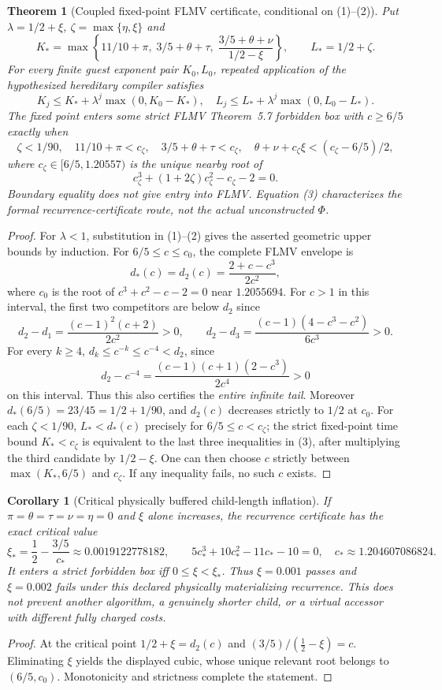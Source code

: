 \documentclass[11pt]{article}
\newtheorem{theorem}{Theorem}
\newtheorem{corollary}{Corollary}
\begin{document}
\begin{theorem}[Coupled fixed-point FLMV certificate, conditional on (1)--(2)]
Put $\lambda=1/2+\xi$, $\zeta=\max\{\eta,\xi\}$ and
\[
K_*=\max\left\{11/10+\pi,\;3/5+\theta+\tau,\;
\frac{3/5+\theta+\nu}{1/2-\xi}\right\},\qquad
L_*=1/2+\zeta.
\]
For every finite guest exponent pair $K_0,L_0$, repeated application of the \emph{hypothesized} hereditary compiler satisfies
\[
K_j\le K_*+\lambda^j\max(0,K_0-K_*),\quad
L_j\le L_*+\lambda^j\max(0,L_0-L_*).
\]
The fixed point enters some strict FLMV Theorem~5.7 forbidden box with $c\ge6/5$ exactly when
\[
\boxed{
\zeta<1/90,\quad
11/10+\pi<c_\zeta,\quad 3/5+\theta+\tau<c_\zeta,\quad
\theta+\nu+c_\zeta\xi<(c_\zeta-6/5)/2, }\tag{3}
\]
where $c_\zeta\in[6/5,1.20557)$ is the unique nearby root of
\[
c_\zeta^3+(1+2\zeta)c_\zeta^2-c_\zeta-2=0.
\]
Boundary equality does not give entry into FLMV. Equation (3) characterizes the \emph{formal recurrence-certificate route}, not the actual unconstructed $\Phi$.
\end{theorem}
\begin{proof}
For $\lambda<1$, substitution in (1)--(2) gives the asserted geometric upper bounds by induction. For $6/5\le c\le c_0$, the complete FLMV envelope is
\[
d_*(c)=d_2(c)=\frac{2+c-c^3}{2c^2},
\]
where $c_0$ is the root of $c^3+c^2-c-2=0$ near $1.2055694$. For $c>1$ in this interval, the first two competitors are below $d_2$ since
\[
d_2-d_1=\frac{(c-1)^2(c+2)}{2c^2}>0,\qquad
d_2-d_3=\frac{(c-1)(4-c^3-c^2)}{6c^3}>0.
\]
For every $k\ge4$, $d_k\le c^{-k}\le c^{-4}<d_2$, since
\[
d_2-c^{-4}=\frac{(c-1)(c+1)(2-c^3)}{2c^4}>0
\]
on this interval. Thus this also certifies the \emph{entire infinite tail}. Moreover $d_*(6/5)=23/45=1/2+1/90$, and $d_2(c)$ decreases strictly to $1/2$ at $c_0$. For each $\zeta<1/90$, $L_*<d_*(c)$ precisely for $6/5\le c<c_\zeta$; the strict fixed-point time bound $K_*<c_\zeta$ is equivalent to the last three inequalities in (3), after multiplying the third candidate by $1/2-\xi$. One can then choose $c$ strictly between $\max(K_*,6/5)$ and $c_\zeta$. If any inequality fails, no such $c$ exists. \end{proof}

\begin{corollary}[Critical physically buffered child-length inflation]
If $\pi=\theta=\tau=\nu=\eta=0$ and $\xi$ alone increases, the recurrence certificate has the exact critical value
\[
\xi_*=\frac12-\frac{3/5}{c_*}\approx0.0019122778182,
\qquad 5c_*^3+10c_*^2-11c_*-10=0,\quad c_*\approx1.204607086824.
\]
It enters a strict forbidden box iff $0\le\xi<\xi_*$. Thus $\xi=0.001$ passes and $\xi=0.002$ fails under this \emph{declared physically materializing recurrence}. This does not prevent another algorithm, a genuinely shorter child, or a virtual accessor with different fully charged costs.
\end{corollary}
\begin{proof}
At the critical point $1/2+\xi=d_2(c)$ and $(3/5)/(\frac12-\xi)=c$. Eliminating $\xi$ yields the displayed cubic, whose unique relevant root belongs to $(6/5,c_0)$. Monotonicity and strictness complete the statement.
\end{proof}
\end{document}
